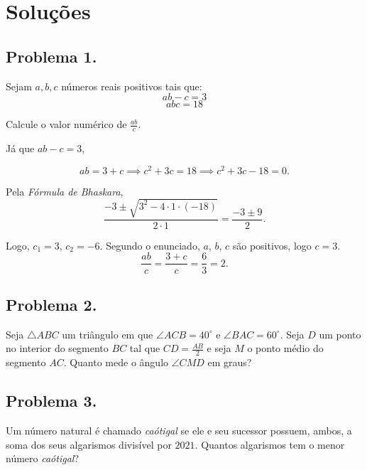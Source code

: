 \documentclass[12pt]{article}
\begin{document}
    \clearpage

  \section{\textsf{Soluções}}
    \subsection{Problema 1.}
      \begin{tcolorbox}[problembox]
           Sejam $a, b, c$ números reais positivos tais que:
          \[
            ab - c = 3
          \]
          \[
           abc = 18
          \]

          Calcule o valor numérico de $\frac{ab}{c}$.
      \end{tcolorbox}
      Já que $ab-c=3$,

      \[
        ab=3+c \implies c^2+3c=18 \implies c^2+3c-18=0.
      \]

      Pela \textit{Fórmula de Bhaskara},
      \[
        \frac{-3 \pm \sqrt{3^2 - 4 \cdot 1 \cdot (-18)}}{2 \cdot 1} = \frac{-3 \pm 9}{2}.
      \]

      Logo, $c_1=3$, $c_2=-6$. Segundo o enunciado, $a$, $b$, $c$ são positivos, logo
      $c=3$.
      \[
        \frac{ab}{c} = \frac{3 + c}{c} = \frac{6}{3} = 2.
      \]
    
    \clearpage

    \subsection{Problema 2.}
      \begin{tcolorbox}[problembox]
        Seja $\triangle ABC$ um triângulo em que $\angle ACB = 40^\circ$ e $\angle
        BAC = 60^\circ$. Seja $D$ um ponto no interior do segmento $BC$ tal que $CD
        = \frac{AB}{2}$ e seja $M$ o ponto médio do segmento $AC$. Quanto mede o ângulo
        $\angle CMD$ em graus?
      \end{tcolorbox}

    \clearpage

    \subsection{Problema 3.}
      \begin{tcolorbox}[problembox]
         Um número natural é chamado \textit{caótigal} se ele e seu sucessor possuem,
          ambos, a soma dos seus algarismos divisível por $2021$. Quantos algarismos tem
          o menor número \textit{caótigal}?
      \end{tcolorbox}
\end{document}
